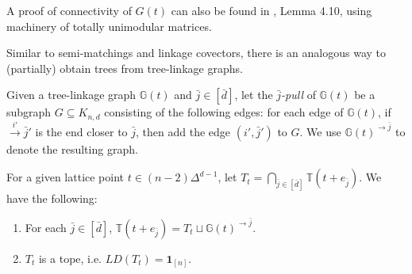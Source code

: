 \documentclass[letterpaper,reqno,11pt]{amsart}
\begin{document}
\begin{remark}
    A proof of connectivity of $G(t)$ can also be found in \cite{TriangulationTOM}, Lemma 4.10, using machinery of totally unimodular matrices.
\end{remark}

Similar to semi-matchings and linkage covectors, there is an analogous way to (partially) obtain trees from tree-linkage graphs.

\begin{definition}
    Given a tree-linkage graph $\mathbb{G}(t)$ and $\bar{j}\in [\bar{d}]$, let the \emph{$\bar{j}$-pull} of $\mathbb{G}(t)$ be a subgraph $G\subseteq K_{n,d}$ consisting of the following edges: for each edge of $\mathbb{G}(t)$, if $\xrightarrow{i'}\bar{j}'$ is the end closer to $\bar{j}$, then add the edge $(i', \bar{j}')$ to $G$. We use $\mathbb{G}(t)^{\rightarrow\bar{j}}$ to denote the resulting graph.
\end{definition}

\begin{proposition}\label{prop:pullplustope}
    For a given lattice point $t\in (n-2)\Delta^{d-1}$, let $T_t = \bigcap_{\bar{j}\in [\bar{d}]} \mathbb{T}(t+e_{\bar{j}})$. We have the following: \begin{enumerate}
        \item[(a)] For each $\bar{j}\in[\bar{d}]$, $\mathbb{T}(t+e_{\bar{j}}) = T_t\sqcup \mathbb{G}(t)^{\rightarrow\bar{j}}$.
        \item[(b)] $T_t$ is a tope, i.e. $LD(T_t) = \mathbf{1}_{[n]}$.
    \end{enumerate}
\end{proposition}
\end{document}
